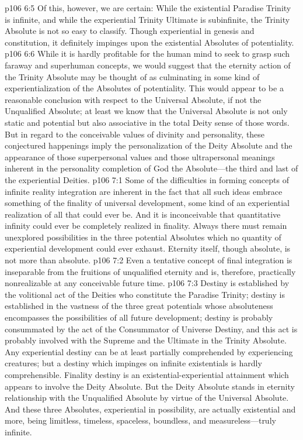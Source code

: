 \vs p106 6:5 Of this, however, we are certain: While the existential Paradise Trinity is infinite, and while the experiential Trinity Ultimate is subinfinite, the Trinity Absolute is not so easy to classify. Though experiential in genesis and constitution, it definitely impinges upon the existential Absolutes of potentiality.
\vs p106 6:6 While it is hardly profitable for the human mind to seek to grasp such faraway and superhuman concepts, we would suggest that the eternity action of the Trinity Absolute may be thought of as culminating in some kind of experientialization of the Absolutes of potentiality. This would appear to be a reasonable conclusion with respect to the Universal Absolute, if not the Unqualified Absolute; at least we know that the Universal Absolute is not only static and potential but also associative in the total Deity sense of those words. But in regard to the conceivable values of divinity and personality, these conjectured happenings imply the personalization of the Deity Absolute and the appearance of those superpersonal values and those ultrapersonal meanings inherent in the personality completion of God the Absolute---the third and last of the experiential Deities.\plusone
{}
\vs p106 7:1 Some of the difficulties in forming concepts of infinite reality integration are inherent in the fact that all such ideas embrace something of the finality of universal development, some kind of an experiential realization of all that could ever be. And it is inconceivable that quantitative infinity could ever be completely realized in finality. Always there must remain unexplored possibilities in the three potential Absolutes which no quantity of experiential development could ever exhaust. Eternity itself, though absolute, is not more than absolute.
\vs p106 7:2 Even a tentative concept of final integration is inseparable from the fruitions of unqualified eternity and is, therefore, practically nonrealizable at any conceivable future time.
\pc \vs p106 7:3 Destiny is established by the volitional act of the Deities who constitute the Paradise Trinity; destiny is established in the vastness of the three great potentials whose absoluteness encompasses the possibilities of all future development; destiny is probably consummated by the act of the Consummator of Universe Destiny, and this act is probably involved with the Supreme and the Ultimate in the Trinity Absolute. Any experiential destiny can be at least partially comprehended by experiencing creatures; but a destiny which impinges on infinite existentials is hardly comprehensible. Finality destiny is an existential\hyp{}experiential attainment which appears to involve the Deity Absolute. But the Deity Absolute stands in eternity relationship with the Unqualified Absolute by virtue of the Universal Absolute. And these three Absolutes, experiential in possibility, are actually existential and more, being limitless, timeless, spaceless, boundless, and measureless---truly infinite.
